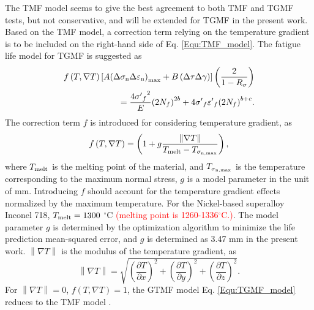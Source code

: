 \documentclass[preprint,5p,twocolumn,10pt,sort&compress]{elsarticle}
\newcommand{\marked}[1]{\textcolor{red}{#1}}
\begin{document}
The TMF model \cite{SUN2019228} seems to give the best agreement to both TMF and TGMF tests, but not conservative, and will be extended for TGMF in the present work.
Based on the TMF model, a correction term relying on the temperature gradient is to be included on the right-hand side of Eq. \eqref{Equ:TMF_model}. The fatigue life model for TGMF is suggested as
\begin{equation}
\begin{aligned}
f\left( {T,\nabla T} \right)\left[ {A{{\left( {\Delta {\sigma _{\rm n}}\Delta {\varepsilon _{\rm n}}} \right)}_{\max }} + B\left( {\Delta \tau \Delta \gamma } \right)} \right]\left( {\frac{2}{{1 - {R_\sigma }}}} \right) \\ 
= \frac{{4{{\sigma '}_f}^2}}{E}{\left( {2{N_f}} \right)^{2b}} + 4{{\sigma '}_f}{{\varepsilon '}_f}{\left( {2{N_f}} \right)^{b + c}}.
\end{aligned}
\label{Equ:TGMF_model}
\end{equation}
The correction term $f$ is introduced for considering temperature gradient, as
\begin{equation}
f\left( {T,\nabla T} \right) = \left( {1 + g\frac{{\left\| {\nabla T} \right\|}}{{{T_{{\rm{melt}}}} - {T_{{\sigma _{\rm n,\max }}}}}}} \right),
\label{Equ:TGMF_term}
\end{equation}
where ${T_{{\rm{melt}}}}$ is the melting point of the material, and ${T_{{\sigma _{\rm n,\max }}}}$ is the temperature corresponding to the maximum normal stress, $g$ is a model parameter in the unit of mm. Introducing $f$ should account for the temperature gradient effects normalized by the maximum temperature. For the Nickel-based superalloy Inconel 718, ${T_{{\rm{melt}}}}=1300$ $^\circ$C \marked{(melting point is 1260-1336$^\circ$C.)}. The model parameter $g$ is determined by the optimization algorithm to minimize the life prediction
mean-squared error, and $g$ is determined as 3.47 mm in the present work. ${\left\| {\nabla T} \right\|}$ is the modulus of the temperature gradient, as
\begin{equation}
\left\| {\nabla T} \right\| = \sqrt {{{\left( {\frac{{\partial T}}{{\partial x}}} \right)}^2} + {{\left( {\frac{{\partial T}}{{\partial y}}} \right)}^2} + {{\left( {\frac{{\partial T}}{{\partial z}}} \right)}^2}}.
\end{equation}
For $\left\| {\nabla T} \right\|=0$, $f\left( {T,\nabla T} \right)=1$, the GTMF model Eq. \eqref{Equ:TGMF_model} reduces to the TMF model \cite{SUN2019228}.
\end{document}
